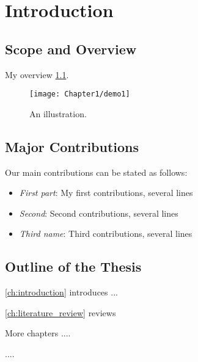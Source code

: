 
\chapter{Introduction} %
\label{ch:introduction} %


\section{Scope and Overview}

My overview \ref{fig:demo1}.

\begin{figure}[htbp]
  \centering
    \texttt{[image: Chapter1/demo1]}
  \caption{An illustration.}
  \label{fig:demo1}
\end{figure}



\section{Major Contributions}
Our main contributions can be stated as follows:
\begin{itemize}
\item \emph{First part}: My first contributions, several lines


\item \emph{Second}: Second contributions, several lines


\item \emph{Third name}: 
Third contributions, several lines

\end{itemize}

\section{Outline of the Thesis}

\cref{ch:introduction} introduces ...

\cref{ch:literature_review} reviews 



More chapters ....


....

